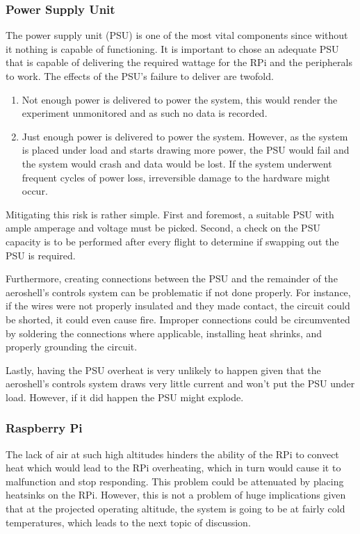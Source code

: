 \subsubsection*{Power Supply Unit}

\indent\indent The power supply unit (PSU) is one of the most vital components since without it nothing is capable of functioning. It is important to chose an adequate PSU that is capable of delivering the required wattage for the RPi and the peripherals to work. The effects of the PSU's failure to deliver are twofold.

\begin{enumerate}
    \item Not enough power is delivered to power the system, this would render the experiment unmonitored and as such no data is recorded.
    \item Just enough power is delivered to power the system. However, as the system is placed under load and starts drawing more power, the PSU would fail and the system would crash and data would be lost. If the system underwent frequent cycles of power loss, irreversible damage to the hardware might occur.
\end{enumerate}

Mitigating this risk is rather simple. First and foremost, a suitable PSU with ample amperage and voltage must be picked. Second, a check on the PSU capacity is to be performed after every flight to determine if swapping out the PSU is required.

Furthermore, creating connections between the PSU and the remainder of the aeroshell's controls system can be problematic if not done properly. For instance, if the wires were not properly insulated and they made contact, the circuit could be shorted, it could even cause fire. Improper connections could be circumvented by soldering the connections where applicable, installing heat shrinks, and properly grounding the circuit.

Lastly, having the PSU overheat is very unlikely to happen given that the aeroshell's controls system draws very little current and won't put the PSU under load. However, if it did happen the PSU might explode.

\subsubsection*{Raspberry Pi}

\indent\indent The lack of air at such high altitudes hinders the ability of the RPi to convect heat which would lead to the RPi overheating, which in turn would cause it to malfunction and stop responding. This problem could be attenuated by placing heatsinks on the RPi. However, this is not a problem of huge implications given that at the projected operating altitude, the system is going to be at fairly cold temperatures, which leads to the next topic of discussion.

